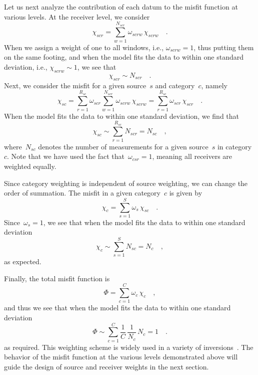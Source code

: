 Let us next analyze the contribution of each datum to the misfit function at various levels.
At the receiver level, we consider
\begin{equation}
\label{eq:reclev}
\chi_{scr} = \sum_{w=1}^{N_{scr}} \omega_{scrw} \, \chi_{scrw}
\quad .
\end{equation}
When we assign a weight of one to all windows,
i.e., $\omega_{scrw}=1$, thus putting them on the same footing,
and when the model fits the data to within one standard deviation, i.e., $\chi_{scrw} \sim 1$, we see that
\begin{equation}
\label{eq:simple_scr}
\chi_{scr} \sim N_{scr}
\quad .
\end{equation}
Next, we consider the misfit for a given source~$s$ and category~$c$, namely
\begin{equation}
\label{eq:catlev}
\chi_{sc} = \sum_{r=1}^{R_{sc}} \omega_{scr} \sum_{w=1}^{N_{scr}} \omega_{scrw}\, \chi_{scrw} = \sum_{r=1}^{R_{sc}} \omega_{scr}\, \chi_{scr}
\quad .
\end{equation}
When the model fits the data to within one standard deviation, we find that
\begin{equation}
\label{eq:simple_cs}
\chi_{sc} \sim \sum_{r=1}^{R_{sc}} N_{scr} = N_{sc} 
\quad ,
\end{equation}
where~$N_{sc}$ denotes the number of measurements for a given source~$s$ in category~$c$.
Note that we have used the fact that~$\omega_{csr}=1$, meaning all receivers are weighted equally. 

Since category weighting is independent of source weighting,
we can change the order of summation.
The misfit in a given category~$c$ is given by
\begin{equation}
\chi_{c} = \sum_{s=1}^{S} \omega_s\,\chi_{sc}
\quad .
\end{equation}
Since~$\omega_{s} = 1$,
we see that when the model fits the data to within one standard deviation
\begin{equation}
\label{eq:simple_chi_c}
\chi_c \sim \sum_{s=1}^{S}N_{sc}=N_c
\quad ,
\end{equation}
as expected.

Finally, the total misfit function is
\begin{equation}
\Phi = \sum_{c=1}^{C} \omega_{c} \,\chi_{c}
\quad ,
\end{equation}
and thus we see that when the model fits the data to within one standard deviation
\begin{equation}
\Phi \sim \sum_{c=1}^{C} \frac{1}{C}\, \frac{1}{N_c} \,N_c = 1
\quad .
\end{equation}
as required. This weighting scheme is widely used in a variety 
of inversions~\cite{zhu2015seismic, bozdaug2016global}.
The behavior of the misfit function at the various levels demonstrated above will guide 
the design of source and receiver weights in the next section.

